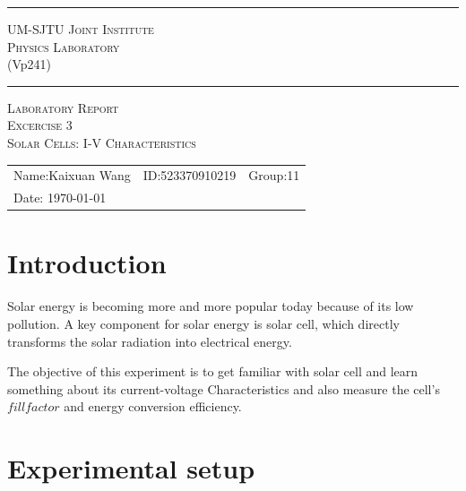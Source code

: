 \documentclass[12pt, a4paper, oneside]{article}
\begin{document}
\begin{center}
	\rule{\textwidth}{1pt}\par
	\vspace{5mm}
	{\large\scshape UM-SJTU Joint Institute}\\[\baselineskip]
	{\large\scshape Physics Laboratory}\\
	(Vp241)
	\rule{\textwidth}{1pt}\par
	\vspace{4cm}
	{\large\scshape Laboratory Report}\\[\baselineskip]
	{\large\scshape Excercise 3}\\[\baselineskip]
	{\large\scshape Solar Cells: I-V Characteristics}\\[\baselineskip]
\end{center}
\vspace{7cm}

\begin{tabular}{lll}
	Name:Kaixuan Wang & ID:523370910219 & Group:11 \\
	Date: {\today}    &                 &         \\
\end{tabular}


\rightline{\footnotesize[rev4.1]}
\pagebreak

\section{Introduction}
\indent

Solar energy is becoming more and more popular today because of its low pollution. A key component for solar energy is solar cell, which 
directly transforms the solar radiation into electrical energy.

The objective of this experiment is to get familiar with solar cell and learn something about its current-voltage 
Characteristics and also measure the cell's $fill factor$ and energy conversion efficiency.

\section{Experimental setup}
\indent
\end{document}
